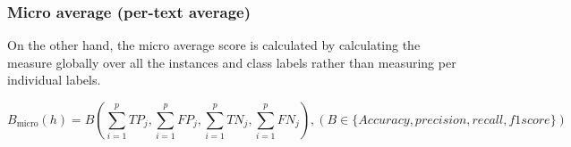 

\subsubsection{Micro average (per-text average)}
On the other hand, the micro average score is calculated by calculating the measure globally over all the instances and class labels rather than measuring per individual labels.\cite{zhang2010multi}

$$B_\mathrm{micro}(h) = B\left(\sum_{i =1}^{p}TP_j,\sum_{i =1}^{p}FP_j,\sum_{i =1}^{p}TN_j,\sum_{i =1}^{p}FN_j\right), (B\in \{Accuracy,precision,recall,f1score\})$$ \cite{zhang2010multi}